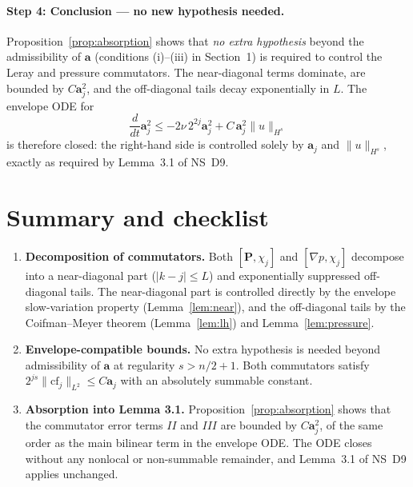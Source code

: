 \documentclass[11pt]{article}
\theoremstyle{definition}
\newcommand{\PP}{\mathbf{P}}          %
\newcommand{\Lp}[1]{L^{#1}}
\newcommand{\Hs}[1]{H^{#1}}
\newcommand{\norm}[1]{\lVert #1 \rVert}
\newcommand{\abs}[1]{\lvert #1 \rvert}
\newcommand{\cf}{\mathrm{cf}}         %
\newcommand{\env}{\mathbf{a}}         %
\begin{document}
\paragraph{Step 4: Conclusion — no new hypothesis needed.}
Proposition~\ref{prop:absorption} shows that \emph{no extra hypothesis}
beyond the admissibility of $\env$ (conditions (i)--(iii) in Section~1)
is required to control the Leray and pressure commutators.  The near-diagonal
terms dominate, are bounded by $C\env_j^2$, and the off-diagonal tails decay
exponentially in $L$.  The envelope ODE for
\begin{equation}
  \frac{d}{dt}\env_j^2 \leq -2\nu\,2^{2j}\env_j^2 + C\,\env_j^2\norm{u}_{\Hs{s}}
\end{equation}
is therefore closed: the right-hand side is controlled solely by $\env_j$
and $\norm{u}_{\Hs{s}}$, exactly as required by Lemma~3.1 of NS~D9.

\section{Summary and checklist}

\begin{enumerate}[label=\textbf{N9.3.\arabic*}]
  \item \textbf{Decomposition of commutators.}
    Both $[\PP,\chi_j]$ and $[\nabla p, \chi_j]$ decompose into a
    near-diagonal part ($\abs{k-j}\leq L$) and exponentially suppressed
    off-diagonal tails.
    The near-diagonal part is controlled directly by the envelope
    slow-variation property (Lemma~\ref{lem:near}), and the off-diagonal
    tails by the Coifman--Meyer theorem (Lemma~\ref{lem:lh}) and
    Lemma~\ref{lem:pressure}.
    \checkmark

  \item \textbf{Envelope-compatible bounds.}
    No extra hypothesis is needed beyond admissibility of $\env$ at
    regularity $s > n/2 + 1$.  Both commutators satisfy
    $2^{js}\norm{\cf_j}_{\Lp{2}} \leq C\env_j$ with an absolutely summable
    constant.  \checkmark

  \item \textbf{Absorption into Lemma 3.1.}
    Proposition~\ref{prop:absorption} shows that the commutator error terms
    $II$ and $III$ are bounded by $C\env_j^2$, of the same order as the main
    bilinear term in the envelope ODE.  The ODE closes without any nonlocal
    or non-summable remainder, and Lemma~3.1 of NS~D9 applies unchanged.
    \checkmark
\end{enumerate}
\end{document}

